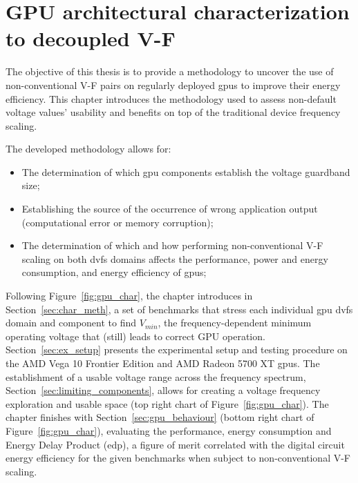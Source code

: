 
\chapter{GPU architectural characterization to decoupled V-F}
\label{chapter:gpu_char}
The objective of this thesis is to provide a methodology to uncover the use of non-conventional V-F pairs on regularly deployed \acrshort{gpu}s to improve their energy efficiency.
This chapter introduces the methodology used to assess non-default voltage values' usability and benefits on top of the traditional device frequency scaling. 

The developed methodology allows for:
\begin{itemize}
    \item The determination of which \acrshort{gpu} components establish the voltage guardband size;
    \item Establishing the source of the occurrence of wrong application output (computational error or memory corruption);
    \item The determination of which and how performing non-conventional V-F scaling on both \acrshort{dvfs} domains affects the performance, power and energy consumption, and energy efficiency of \acrshort{gpu}s;
\end{itemize}

Following Figure~\ref{fig:gpu_char}, the chapter introduces in Section~\ref{sec:char_meth}, a set of benchmarks that stress each individual \acrshort{gpu} \acrshort{dvfs} domain and component to find $V_{min}$, the frequency-dependent minimum operating voltage that (still) leads to correct GPU operation. Section~\ref{sec:ex_setup} presents the experimental setup and testing procedure on the AMD Vega 10 Frontier Edition and AMD Radeon 5700 XT \acrshort{gpu}s. The establishment of a usable voltage range across the frequency spectrum, Section~\ref{sec:limiting_components}, allows for creating a voltage frequency exploration and usable space (top right chart of Figure~\ref{fig:gpu_char}). The chapter finishes with Section~\ref{sec:gpu_behaviour} (bottom right chart of Figure~\ref{fig:gpu_char}),  evaluating the performance, energy consumption and Energy Delay Product (\acrshort{edp}), a figure of merit correlated with the digital circuit energy efficiency for the given benchmarks when subject to non-conventional V-F scaling.


